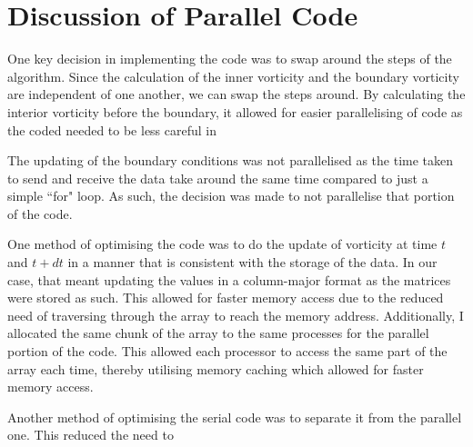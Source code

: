 \documentclass[11pt]{article}
\begin{document}
	\section{Discussion of Parallel Code}
	One key decision in implementing the code was to swap around the steps of the algorithm. Since the calculation of the inner vorticity and the boundary vorticity are independent of one another, we can swap the steps around. By calculating the interior vorticity before the boundary, it allowed for easier parallelising of code as the coded needed to be less careful in
	
	The updating of the boundary conditions was not parallelised as the time taken to send and receive the data take around the same time compared to just a simple ``for" loop. As such, the decision was made to not parallelise that portion of the code.
	
	One method of optimising the code was to do the update of vorticity at time $t$ and $t+dt$ in a manner that is consistent with the storage of the data. In our case, that meant updating the values in a column-major format as the matrices were stored as such. This allowed for faster memory access due to the reduced need of traversing through the array to reach the memory address. Additionally, I allocated the same chunk of the array to the same processes for the parallel portion of the code. This allowed each processor to access the same part of the array each time, thereby utilising memory caching which allowed for faster memory access.
	
	Another method of optimising the serial code was to separate it from the parallel one. This reduced the need to
\end{document}
